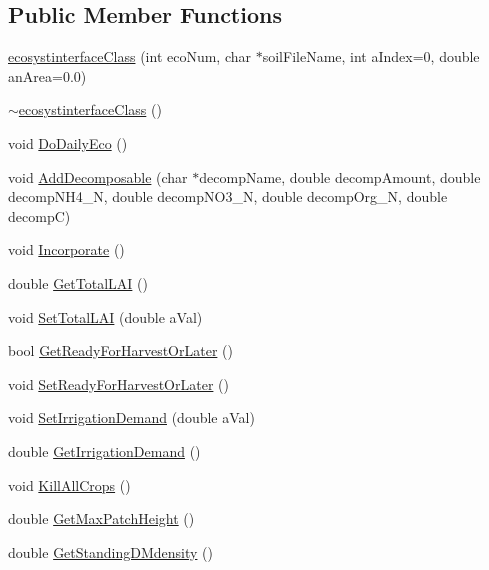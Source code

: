 \subsection*{Public Member Functions}
\begin{DoxyCompactItemize}
\item 
\hyperlink{classecosystinterface_class_a5287dbc93b0992c1cef956b22cd20c6b}{ecosystinterfaceClass} (int ecoNum, char $\ast$soilFileName, int aIndex=0, double anArea=0.0)
\item 
\hyperlink{classecosystinterface_class_ace2e9be8342e652c70db7ad887fa72c0}{$\sim$ecosystinterfaceClass} ()
\item 
void \hyperlink{classecosystinterface_class_a5419110219a9ddfc05702edb8e256066}{DoDailyEco} ()
\item 
void \hyperlink{classecosystinterface_class_a6941cd9aad0c1e2b20eedaf661c28894}{AddDecomposable} (char $\ast$decompName, double decompAmount, double decompNH4\_\-N, double decompNO3\_\-N, double decompOrg\_\-N, double decompC)
\item 
void \hyperlink{classecosystinterface_class_a16d2e00bff76a098b1b64601d900647c}{Incorporate} ()
\item 
double \hyperlink{classecosystinterface_class_ae52da265e52da2468db152b25ed389eb}{GetTotalLAI} ()
\item 
void \hyperlink{classecosystinterface_class_a5a695a80d79051c490b3b9d780361c33}{SetTotalLAI} (double aVal)
\item 
bool \hyperlink{classecosystinterface_class_abc91c77ffd4557561789435c86849a21}{GetReadyForHarvestOrLater} ()
\item 
void \hyperlink{classecosystinterface_class_adb5fdaf7fb4ad34cd7b1ab0d1f3cecaf}{SetReadyForHarvestOrLater} ()
\item 
void \hyperlink{classecosystinterface_class_a9e7ecaf087027f2b1ce473ace863f13c}{SetIrrigationDemand} (double aVal)
\item 
double \hyperlink{classecosystinterface_class_a131f3d53db5a70fffa21a2353f412ae6}{GetIrrigationDemand} ()
\item 
void \hyperlink{classecosystinterface_class_a189a315993f809e6f9b766f67600c898}{KillAllCrops} ()
\item 
double \hyperlink{classecosystinterface_class_ac2c26676f18f98dd135295cbb04616e9}{GetMaxPatchHeight} ()
\item 
double \hyperlink{classecosystinterface_class_a1f1dc9731b7216b361ac5ebe3303d42b}{GetStandingDMdensity} ()
\item 

\end{DoxyCompactItemize}
